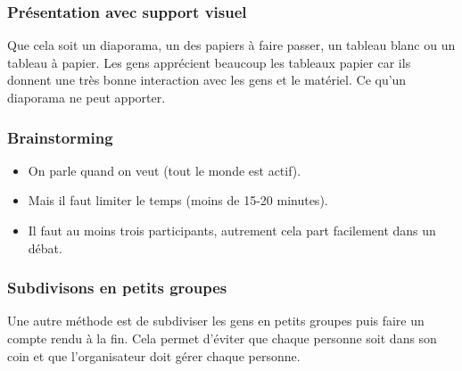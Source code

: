 \subsubsection{Présentation avec support visuel}
Que cela soit un diaporama, un des papiers à faire passer, un tableau blanc ou un tableau à papier.
Les gens apprécient beaucoup les tableaux papier car ils donnent une très bonne interaction avec les gens et le matériel. Ce qu'un diaporama ne peut apporter.

\subsubsection{Brainstorming}
\begin{itemize}
    \item On parle quand on veut (tout le monde est actif).
    \item Mais il faut limiter le temps (moins de 15-20 minutes).
    \item Il faut au moins trois participants, autrement cela part facilement dans un débat.
\end{itemize}

\subsubsection{Subdivisons en petits groupes}
Une autre méthode est de subdiviser les gens en petits groupes puis faire un compte rendu à la fin. Cela permet d'éviter que chaque personne soit dans son coin et que l'organisateur doit gérer chaque personne.

